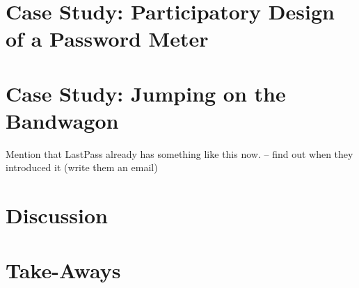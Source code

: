 \section{Case Study: Participatory Design of a Password Meter}

\section{Case Study: Jumping on the Bandwagon}
Mention that LastPass already has something like this now. -- find out when they introduced it (write them an email) 

\section{Discussion}


\section{Take-Aways}



